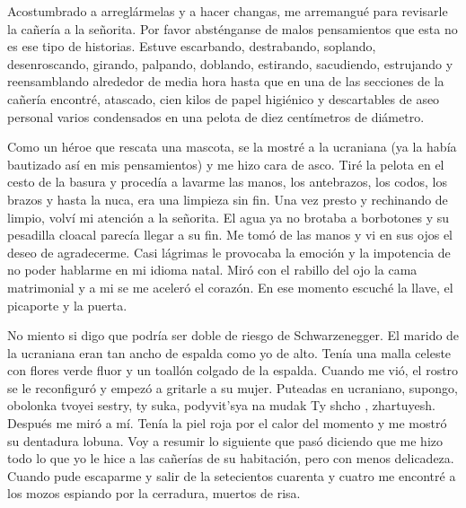 \documentclass[11pt,twoside,openright,a6paper]{book}
\begin{document}
  Acostumbrado a
arreglármelas y a hacer changas, me arremangué para revisarle la cañería a
la señorita. Por favor absténganse de malos pensamientos que esta no es ese
tipo de historias. Estuve escarbando, destrabando, soplando, desenroscando,
girando, palpando, doblando, estirando, sacudiendo, estrujando y reensamblando
alrededor de media hora hasta que en una de las secciones de la cañería
encontré, atascado, cien kilos de papel higiénico y descartables de aseo
personal varios condensados en una pelota de diez centímetros de diámetro.

Como un héroe que rescata una mascota, se la mostré a la ucraniana (ya la
había bautizado así en mis pensamientos) y me hizo cara de asco. Tiré
la pelota en el cesto de la basura y procedía a lavarme las manos, los
antebrazos, los codos, los brazos y hasta la nuca, era una limpieza sin fin.
Una vez presto y rechinando de limpio, volví mi atención a la señorita. El
agua ya no brotaba a borbotones y su pesadilla cloacal parecía llegar a su
fin. Me tomó de las manos y vi en sus ojos el deseo de agradecerme. Casi
lágrimas le provocaba la emoción y la impotencia de no poder hablarme en
mi idioma natal. Miró con el rabillo del ojo la cama matrimonial y a mi
se me aceleró el corazón. En ese momento escuché la llave, el picaporte
y la puerta.

No miento si digo que podría ser doble de riesgo de Schwarzenegger. El
marido de la ucraniana eran tan ancho de espalda como yo de alto. Tenía
una malla celeste con flores verde fluor y un toallón colgado de la
espalda. Cuando me vió, el rostro se le reconfiguró y empezó a gritarle a
su mujer. Puteadas en ucraniano, supongo, obolonka tvoyei sestry, ty suka,
podyvit'sya na mudak Ty shcho , zhartuyesh. Después me miró a mí. Tenía
la piel roja por el calor del momento y me mostró su dentadura lobuna. Voy
a resumir lo siguiente que pasó diciendo que me hizo todo lo que yo le
hice a las cañerías de su habitación, pero con menos delicadeza. Cuando
pude escaparme y salir de la setecientos cuarenta y cuatro me encontré a
los mozos espiando por la cerradura, muertos de risa.
\end{document}
